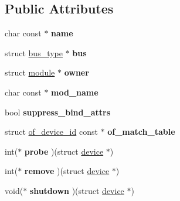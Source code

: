 \subsection*{Public Attributes}
\begin{DoxyCompactItemize}
\item 
\hypertarget{structdevice__driver_adb11ca2945f69218c3ad2c7d727cd8cd}{}char const $\ast$ {\bfseries name}\label{structdevice__driver_adb11ca2945f69218c3ad2c7d727cd8cd}

\item 
\hypertarget{structdevice__driver_ab6cea67302edfbbfa9eb9bcd235905ca}{}struct \hyperlink{structbus__type}{bus\+\_\+type} $\ast$ {\bfseries bus}\label{structdevice__driver_ab6cea67302edfbbfa9eb9bcd235905ca}

\item 
\hypertarget{structdevice__driver_a3b50a97cf95eca6dcefc106eae8a0ed6}{}struct \hyperlink{structmodule}{module} $\ast$ {\bfseries owner}\label{structdevice__driver_a3b50a97cf95eca6dcefc106eae8a0ed6}

\item 
\hypertarget{structdevice__driver_a4c357272e09f22fedd097bb1d6010562}{}char const $\ast$ {\bfseries mod\+\_\+name}\label{structdevice__driver_a4c357272e09f22fedd097bb1d6010562}

\item 
\hypertarget{structdevice__driver_a3833cecf9543a98bc75b98989b22bc7e}{}bool {\bfseries suppress\+\_\+bind\+\_\+attrs}\label{structdevice__driver_a3833cecf9543a98bc75b98989b22bc7e}

\item 
\hypertarget{structdevice__driver_a6537d7cd86c7396f6d6001d18635c55a}{}struct \hyperlink{structof__device__id}{of\+\_\+device\+\_\+id} const $\ast$ {\bfseries of\+\_\+match\+\_\+table}\label{structdevice__driver_a6537d7cd86c7396f6d6001d18635c55a}

\item 
\hypertarget{structdevice__driver_a3d454f7d44cb1c1a31f1e7f0731b798b}{}int($\ast$ {\bfseries probe} )(struct \hyperlink{structdevice}{device} $\ast$)\label{structdevice__driver_a3d454f7d44cb1c1a31f1e7f0731b798b}

\item 
\hypertarget{structdevice__driver_a9d1744174448c87ae4a2cd7ed2d02a06}{}int($\ast$ {\bfseries remove} )(struct \hyperlink{structdevice}{device} $\ast$)\label{structdevice__driver_a9d1744174448c87ae4a2cd7ed2d02a06}

\item 
\hypertarget{structdevice__driver_aa5fe455a49b828d81bc04fa44ed6d5cf}{}void($\ast$ {\bfseries shutdown} )(struct \hyperlink{structdevice}{device} $\ast$)\label{structdevice__driver_aa5fe455a49b828d81bc04fa44ed6d5cf}


\end{DoxyCompactItemize}
